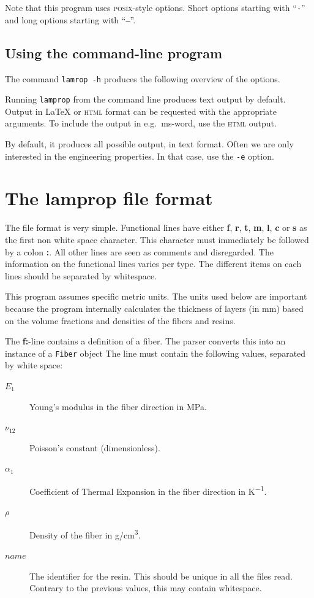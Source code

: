 \documentclass[a4paper,landscape,oneside,11pt,twocolumn]{memoir}
\begin{document}
Note that this program uses \textsc{posix}-style options. Short
options starting with “\texttt{-}” and long options starting with “\texttt{--}”.

\section{Using the command-line program} %

The command \texttt{lamrop -h} produces the following overview of the options.



Running \texttt{lamprop} from the command line produces text output by
default. Output in \LaTeX{} or \textsc{html} format can be requested with the
appropriate arguments. To include the output in e.g.\ ms-word, use the
\textsc{html} output.

By default, it produces all possible output, in text format.
Often we are only interested in the engineering properties.
In that case, use the \texttt{-e} option.

\chapter{The lamprop file format} %

The file format is very simple. Functional lines have either \textbf{f},
\textbf{r}, \textbf{t}, \textbf{m}, \textbf{l}, \textbf{c} or \textbf{s} as
the first non white space character. This character must immediately be
followed by a colon \textbf{:}. All other lines are seen as comments and
disregarded.
The information on the functional lines varies per type.
The different items on each lines should be separated by whitespace.

This program assumes specific metric units. The units used below are important
because the program internally calculates the thickness of layers (in mm)
based on the volume fractions and densities of the fibers and resins.

The \textbf{f:}-line contains a definition of a fiber. The parser
converts this into an instance of a \texttt{Fiber} object The line must
contain the following values, separated by white space:
\begin{description}
    \item[$E_1$] Young's modulus in the fiber direction in \si{MPa}.
    \item[$\nu_{12}$] Poisson's constant (dimensionless).
    \item[$\alpha_1$] Coefficient of Thermal Expansion in the fiber direction
        in \si{K^{-1}}.
    \item[$\rho$] Density of the fiber in \si{g/cm^3}.
    \item[$name$] The identifier for the resin. This should be unique in all
        the files read. Contrary to the previous values, this may contain
        whitespace.
\end{description}
\end{document}
